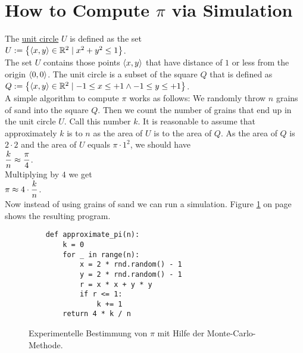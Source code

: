 \section{How to Compute $\pi$ via Simulation}
The \href{https://en.wikipedia.org/wiki/Unit_circle}{unit circle} $U$ is defined as the set 
\\[0.2cm]
\hspace*{1.3cm}
$U := \bigl\{ \pair(x,y) \in \mathbb{R}^2 \mid x^2 + y^2 \leq 1 \bigr\}$.
\\[0.2cm]
The set $U$ contains those points $\pair(x,y)$ that have distance of $1$ or less from the origin
$\pair(0,0)$.  The unit circle is a subset of the square $Q$ that is defined as 
\\[0.2cm]
\hspace*{1.3cm}
$Q := \bigl\{ \pair(x,y) \in \mathbb{R}^2 \mid -1 \leq x \leq +1 \wedge -1 \leq y \leq +1 \bigr\}$.
\\[0.2cm]
A simple algorithm to compute $\pi$ works as follows:  We randomly throw $n$ grains of sand into the square $Q$.
Then we count the number of grains that end up in the unit circle $U$.  Call this number $k$.
It is reasonable to assume that approximately $k$ is to $n$ as the area of $U$ is to the area of $Q$.  As the area of $Q$ is
$2 \cdot 2$ and the area of $U$ equals $\pi \cdot 1^2$, we should have
\\[0.2cm]
\hspace*{1.3cm}
$\displaystyle\frac{k}{n} \approx \frac{\pi}{4}$.
\\[0.2cm]
Multiplying by $4$ we get
\\[0.2cm]
\hspace*{1.3cm}
$\displaystyle \pi \approx 4 \cdot \frac{k}{n}$.
\\[0.2cm]
Now instead of using grains of sand we can run a simulation.  Figure \ref{fig:Monte-Carlo-Pi.ipynb} on page
\pageref{fig:Monte-Carlo-Pi.ipynb} shows the resulting program.


\begin{figure}[!ht]
\centering
\begin{verbatim}
    def approximate_pi(n):
        k = 0
        for _ in range(n):
            x = 2 * rnd.random() - 1
            y = 2 * rnd.random() - 1
            r = x * x + y * y
            if r <= 1:
                k += 1
        return 4 * k / n
\end{verbatim}
\vspace*{-0.3cm}
\caption{Experimentelle Bestimmung von $\pi$ mit Hilfe der Monte-Carlo-Methode.}
\label{fig:Monte-Carlo-Pi.ipynb}
\end{figure}

